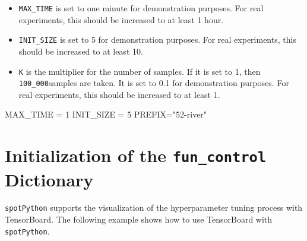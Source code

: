 \documentclass[
  letterpaper,
  DIV=11,
  numbers=noendperiod]{scrreprt}
\newenvironment{Shaded}{\begin{snugshade}}{\end{snugshade}}
\newcommand{\DecValTok}[1]{\textcolor[rgb]{0.68,0.00,0.00}{#1}}
\newcommand{\NormalTok}[1]{\textcolor[rgb]{0.00,0.23,0.31}{#1}}
\newcommand{\OperatorTok}[1]{\textcolor[rgb]{0.37,0.37,0.37}{#1}}
\newcommand{\StringTok}[1]{\textcolor[rgb]{0.13,0.47,0.30}{#1}}
\providecommand{\tightlist}{%
  \setlength{\itemsep}{0pt}\setlength{\parskip}{0pt}}\usepackage{longtable,booktabs,array}
\begin{document}
\begin{tcolorbox}[enhanced jigsaw, rightrule=.15mm, opacityback=0, colframe=quarto-callout-caution-color-frame, opacitybacktitle=0.6, toptitle=1mm, arc=.35mm, colbacktitle=quarto-callout-caution-color!10!white, coltitle=black, toprule=.15mm, leftrule=.75mm, titlerule=0mm, title=\textcolor{quarto-callout-caution-color}{\faFire}\hspace{0.5em}{Caution: Run time and initial design size should be increased for real
experiments}, bottomrule=.15mm, breakable, bottomtitle=1mm, left=2mm, colback=white]

\begin{itemize}
\tightlist
\item
  \texttt{MAX\_TIME} is set to one minute for demonstration purposes.
  For real experiments, this should be increased to at least 1 hour.
\item
  \texttt{INIT\_SIZE} is set to 5 for demonstration purposes. For real
  experiments, this should be increased to at least 10.
\item
  \texttt{K} is the multiplier for the number of samples. If it is set
  to 1, then \texttt{100\_000}samples are taken. It is set to 0.1 for
  demonstration purposes. For real experiments, this should be increased
  to at least 1.
\end{itemize}

\end{tcolorbox}

\begin{Shaded}
\begin{Highlighting}[]
\NormalTok{MAX\_TIME }\OperatorTok{=} \DecValTok{1}
\NormalTok{INIT\_SIZE }\OperatorTok{=} \DecValTok{5}
\NormalTok{PREFIX}\OperatorTok{=}\StringTok{"52{-}river"}
\end{Highlighting}
\end{Shaded}

\hypertarget{initialization-of-the-fun_control-dictionary-2}{%
\section{\texorpdfstring{Initialization of the \texttt{fun\_control}
Dictionary}{Initialization of the fun\_control Dictionary}}\label{initialization-of-the-fun_control-dictionary-2}}

\texttt{spotPython} supports the visualization of the hyperparameter
tuning process with TensorBoard. The following example shows how to use
TensorBoard with \texttt{spotPython}.
\end{document}
